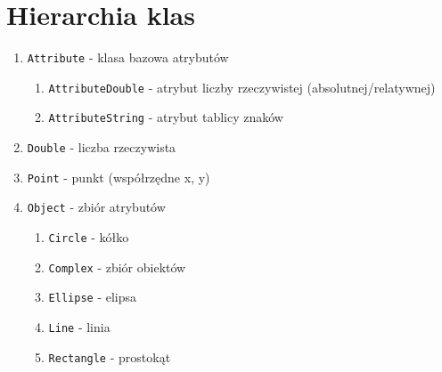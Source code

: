 \documentclass[a4paper, 12pt]{article}
\begin{document}
\section*{Hierarchia klas}
\begin{enumerate}
    \item \texttt{Attribute} - klasa bazowa atrybutów
    \begin{enumerate}
        \item \texttt{AttributeDouble} - atrybut liczby rzeczywistej (absolutnej/relatywnej)
        \item \texttt{AttributeString} - atrybut tablicy znaków
    \end{enumerate}
    \item \texttt{Double} - liczba rzeczywista 
    \item \texttt{Point} - punkt (współrzędne x, y)
    \item \texttt{Object} - zbiór atrybutów
    \begin{enumerate}
        \item \texttt{Circle} - kółko
        \item \texttt{Complex} - zbiór obiektów
        \item \texttt{Ellipse} - elipsa
        \item \texttt{Line} - linia
        \item \texttt{Rectangle} - prostokąt
    \end{enumerate}
\end{enumerate}
\end{document}
